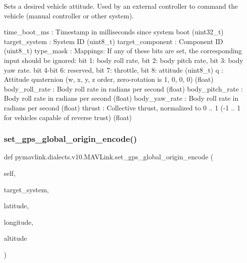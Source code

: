 \begin{DoxyVerb}
\begin{DoxyVerb}
\begin{DoxyVerb}
\begin{DoxyVerb}
\begin{DoxyVerb}
\begin{DoxyVerb}
\begin{DoxyVerb}
\begin{DoxyVerb}
\begin{DoxyVerb}
\begin{DoxyVerb}
\begin{DoxyVerb}Sets a desired vehicle attitude. Used by an external controller to
command the vehicle (manual controller or other
system).

time_boot_ms              : Timestamp in milliseconds since system boot (uint32_t)
target_system             : System ID (uint8_t)
target_component          : Component ID (uint8_t)
type_mask                 : Mappings: If any of these bits are set, the corresponding input should be ignored: bit 1: body roll rate, bit 2: body pitch rate, bit 3: body yaw rate. bit 4-bit 6: reserved, bit 7: throttle, bit 8: attitude (uint8_t)
q                         : Attitude quaternion (w, x, y, z order, zero-rotation is 1, 0, 0, 0) (float)
body_roll_rate            : Body roll rate in radians per second (float)
body_pitch_rate           : Body roll rate in radians per second (float)
body_yaw_rate             : Body roll rate in radians per second (float)
thrust                    : Collective thrust, normalized to 0 .. 1 (-1 .. 1 for vehicles capable of reverse trust) (float)\end{DoxyVerb}
 \mbox{\label{classpymavlink_1_1dialects_1_1v10_1_1MAVLink_a2357a4ea9db22e91fd2a5e3a4736f809}} 
\subsubsection{\texorpdfstring{set\+\_\+gps\+\_\+global\+\_\+origin\+\_\+encode()}{set\_gps\_global\_origin\_encode()}}
{\footnotesize\ttfamily def pymavlink.\+dialects.\+v10.\+M\+A\+V\+Link.\+set\+\_\+gps\+\_\+global\+\_\+origin\+\_\+encode (\begin{DoxyParamCaption}\item[{}]{self,  }\item[{}]{target\+\_\+system,  }\item[{}]{latitude,  }\item[{}]{longitude,  }\item[{}]{altitude }\end{DoxyParamCaption})}


\end{DoxyVerb}
\end{DoxyVerb}
\end{DoxyVerb}
\end{DoxyVerb}
\end{DoxyVerb}
\end{DoxyVerb}
\end{DoxyVerb}
\end{DoxyVerb}
\end{DoxyVerb}
\end{DoxyVerb}
